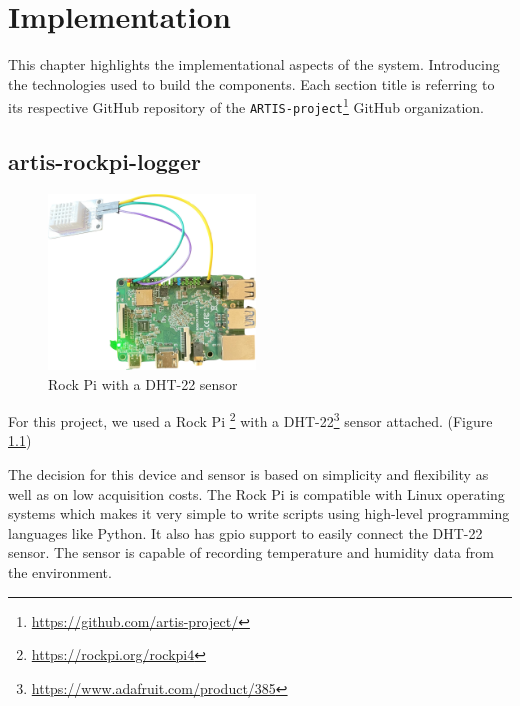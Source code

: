 \chapter{Implementation}
This chapter highlights the implementational aspects of the system. Introducing the technologies used to build the components. Each section title is referring to its respective GitHub repository of the \texttt{ARTIS-project}\footnote{\href{https://github.com/artis-project/}{https://github.com/artis-project/}} GitHub organization.

\section{artis-rockpi-logger}

\begin{figure}
    \centering
    \includegraphics[width=0.49\textwidth]{resources/rock-pi.png}
    \caption{Rock Pi with a DHT-22 sensor} 
    \label{fig:rock-pi}
\end{figure}

For this project, we used a Rock Pi \footnote{\href{https://rockpi.org/rockpi4}{https://rockpi.org/rockpi4}} with a DHT-22\footnote{\href{https://www.adafruit.com/product/385}{https://www.adafruit.com/product/385}} sensor attached. (Figure \ref{fig:rock-pi})

The decision for this device and sensor is based on simplicity and flexibility as well as on low acquisition costs. The Rock Pi is compatible with Linux operating systems which makes it very simple to write scripts using high-level programming languages like Python. It also has \gls{gpio} support to easily connect the DHT-22 sensor. The sensor is capable of recording temperature and humidity data from the environment.

